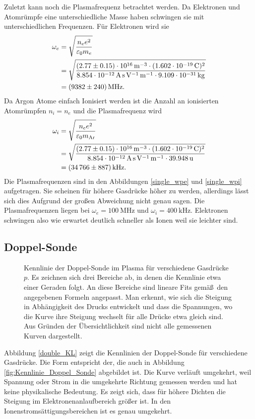 Zuletzt kann noch die Plasmafrequenz betrachtet werden.
Da Elektronen und Atomr\"umpfe eine unterschiedliche Masse haben schwingen sie mit unterschiedlichen Frequenzen.
F\"ur Elektronen wird sie
\begin{align}
\omega_e
    &=\sqrt{\frac{n_e e^2}{\varepsilon_0 m_e}}
    \label{swpe}\\
    &=\sqrt{\frac{\siAnea \cdot(\sie)^2}{\sieO\cdot\sime}}\nonumber\\
    &=\siAwpea .\nonumber
\end{align}
Da Argon Atome einfach Ionisiert werden ist die Anzahl an ionisierten Atomr\"umpfen $n_i=n_e$ und die Plasmafrequenz wird
\begin{align}
\omega_i
    &=\sqrt{\frac{n_e e^2}{\varepsilon_0 m_\text{Ar}}}
    \label{swpe}\\
    &=\sqrt{\frac{\siAnea \cdot(\sie)^2}{\sieO\cdot\simAr}}\nonumber\\
    &=\siAwpia .\nonumber
\end{align}
Die Plasmafrequenzen sind in den Abbildungen \vref{single_wpe} und \vref{single_wpi} aufgetragen.
Sie scheinen f\"ur h\"ohere Gasdr\"ucke h\"oher zu werden, allerdings l\"asst sich dies Aufgrund der gro\ss en Abweichung nicht genau sagen.
Die Plasmafrequenzen liegen bei $\omega_e=\SI{100}{\mega\hertz}$ und $\omega_i=\SI{400}{\kilo\hertz}$.
Elektronen schwingen also wie erwartet deutlich schneller als Ionen weil sie leichter sind.

\FloatBarrier
\subsection{Doppel-Sonde}\label{double}
\begin{figure}[htbp]
    \centering
    
    \caption{
        Kennlinie der Doppel-Sonde im Plasma f\"ur verschiedene Gasdr\"ucke $p$.
        Es zeichnen sich drei Bereiche ab, in denen die Kennlinie etwa einer Geraden folgt.
        An diese Bereiche sind lineare Fits gem\"a\ss\ den angegebenen Formeln angepasst.
        Man erkennt, wie sich die Steigung in Abh\"angigkeit des Drucks entwickelt und dass die Spannungen, wo die Kurve ihre Steigung wechselt f\"ur alle Dr\"ucke etwa gleich sind.
        Aus Gr\"unden der \"Ubersichtlichkeit sind nicht alle gemessenen Kurven dargestellt.
    }
    \label{double_KL}
\end{figure}

Abbildung \vref{double_KL} zeigt die Kennlinien der Doppel-Sonde f\"ur verschiedene Gasdr\"ucke.
Die Form entspricht der, die auch in Abbildung \vref{fig:Kennlinie_Doppel_Sonde} abgebildet ist.
Die Kurve verl\"auft umgekehrt, weil Spannung oder Strom in die umgekehrte Richtung gemessen werden und hat keine physikalische Bedeutung.
Es zeigt sich, dass f\"ur h\"ohere Dichten die Steigung im Elektronenanlaufbereich gr\"o\ss er ist.
In den Ionenstroms\"attigungsbereichen ist es genau umgekehrt.

